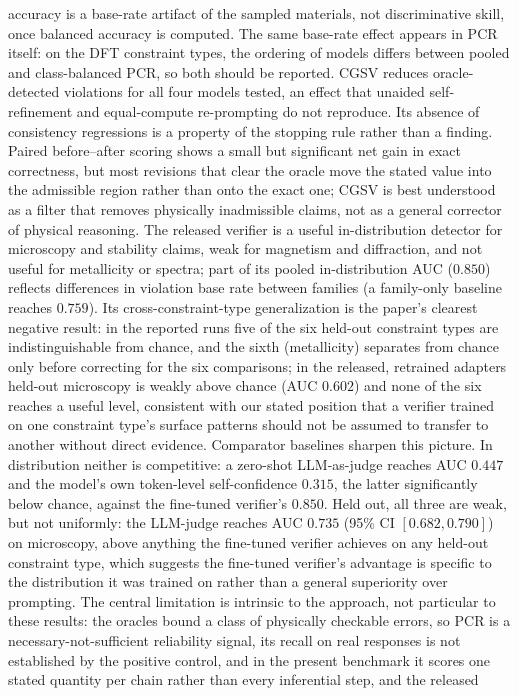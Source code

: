 \documentclass[pdflatex,sn-nature]{sn-jnl}
\newcommand{\rev}[1]{#1}
\newcommand{\rev}[1]{{\color{blue}#1}}
\begin{document}
accuracy is a base-rate artifact of the sampled materials, not discriminative skill, once
balanced accuracy is computed. \rev{The same base-rate effect appears in PCR itself: on the DFT
constraint types, the ordering of models differs between pooled and class-balanced PCR, so both
should be reported. CGSV reduces oracle-detected violations for all four models tested, an effect
that unaided self-refinement and equal-compute re-prompting do not reproduce. Its absence of
consistency regressions is a property of the stopping rule rather than a finding. Paired
before--after scoring shows a small but significant net gain in exact correctness, but most
revisions that clear the oracle move the stated value into the admissible region rather than onto
the exact one; CGSV is best understood as a filter that removes physically inadmissible claims, not
as a general corrector of physical reasoning.} The released verifier is a useful in-distribution
detector \rev{for microscopy and stability claims, weak for magnetism and diffraction, and not useful
for metallicity or spectra; part of its pooled in-distribution AUC ($0.850$) reflects differences in
violation base rate between families (a family-only baseline reaches $0.759$).} Its
cross-constraint-type generalization is the paper's clearest
negative result: \rev{in the reported runs} five of the six held-out constraint types are indistinguishable from
chance, and the sixth (metallicity) separates from chance only before correcting for the
six comparisons\rev{; in the released, retrained adapters held-out microscopy is weakly above chance
(AUC $0.602$) and none of the six reaches a useful level}, consistent with our stated position that a verifier trained on one
constraint type's surface patterns should not be assumed to transfer to another
without direct evidence. Comparator baselines sharpen this picture. In distribution
neither is competitive: a zero-shot LLM-as-judge reaches AUC $0.447$ and the model's own
token-level self-confidence $0.315$, the latter significantly below chance, against the
fine-tuned verifier's $0.850$. Held out, all three are weak, but not uniformly: the
LLM-judge reaches AUC $0.735$ (95\% CI $[0.682,0.790]$) on microscopy, above anything the
fine-tuned verifier achieves on any held-out constraint type, which suggests the fine-tuned
verifier's advantage is specific to the distribution it was trained on rather than a general
superiority over prompting. The central limitation is intrinsic to the approach, not
particular to these results: the oracles bound a class of physically checkable
errors, so PCR is a necessary-not-sufficient reliability signal\rev{, its recall on real responses
is not established by the positive control, and in the present benchmark it scores one stated
quantity per chain rather than every inferential step}, and the released
\end{document}
